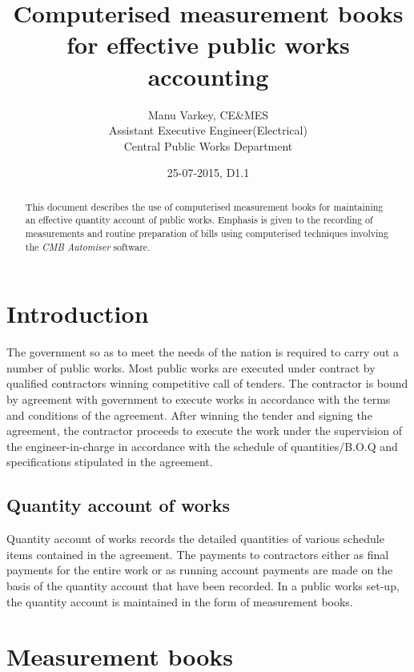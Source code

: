\documentclass[twoside,a4paper]{refart}
\title{Computerised measurement books for effective public works accounting}
\author{Manu Varkey, CE\&MES \\
	Assistant Executive Engineer(Electrical) \\
	Central Public Works Department \\}
\date{25-07-2015, D1.1}
\begin{document}
	
	\maketitle
	
	\begin{abstract}
		This document describes the use of computerised measurement books for maintaining an effective quantity account of public works. Emphasis is given to the recording of measurements and	routine preparation of bills using computerised techniques involving the \emph{CMB Automiser} software.
	\end{abstract}
	
	\tableofcontents
	
	\newpage
	
	
	
	\section{Introduction}
	
	 The government so as to meet the needs of the nation is required to carry out a number of public works. Most public works are executed under contract by qualified contractors winning competitive call of tenders. The contractor is bound by agreement with government to execute works in accordance with the terms and conditions of the agreement. After winning the tender and signing the agreement, the contractor proceeds to execute the work under the supervision of the engineer-in-charge in accordance with the schedule of quantities/B.O.Q and specifications stipulated in the agreement.
	 
	 \subsection{Quantity account of works}
	 
	 Quantity account of works records the detailed quantities of various schedule items contained in the agreement. The payments to contractors either as final payments for the entire work or as running account payments are made on the basis of the quantity account that have been recorded. In a public works set-up, the quantity account is maintained in the form of measurement books.
	 
	 \section{Measurement books}
	 
\end{document}

